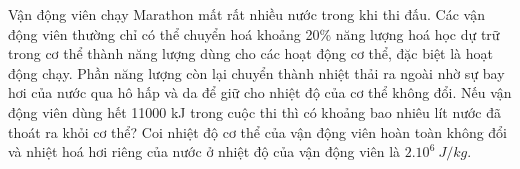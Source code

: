 \begin{vidu}
	Vận động viên chạy Marathon mất rất nhiều nước trong khi thi đấu. Các vận động viên thường chỉ có thể chuyển hoá khoảng 20\% năng lượng hoá học dự trữ trong cơ thể thành năng lượng dùng cho các hoạt động cơ thể, đặc biệt là hoạt động chạy. Phần năng lượng còn lại chuyển thành nhiệt thải ra ngoài nhờ sự bay hơi của nước qua hô hấp và da để giữ cho nhiệt độ của cơ thể không đổi. Nếu vận động viên dùng hết 11000 kJ trong cuộc thi thì có khoảng bao nhiêu lít nước đã thoát ra khỏi cơ thể? Coi nhiệt độ cơ thể của vận động viên hoàn toàn không đổi và nhiệt hoá hơi riêng của nước ở nhiệt độ của vận động viên là $2.10^6\ J/kg$.	
	\loigiai{
		\begin{itemize}
			\item 
			\item 
			\item 
			\item 
			\item 
			\item 
		\end{itemize}
	}
\end{vidu}
